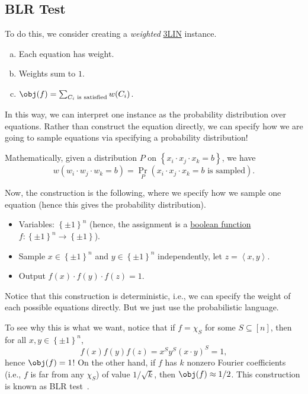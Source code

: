 \subsection{BLR Test}
To do this, we consider creating a \emph{weighted} \hyperref[prb:max-3LIN]{3LIN} instance.
\begin{enumerate}[(a)]
	\item Each equation has weight.
	\item Weights sum to \(1\).
	\item \(\obj(f) = \sum_{C_i \text{ is satisfied}} w(C_i)\).
\end{enumerate}
In this way, we can interpret one instance as the probability distribution over equations. Rather than construct the equation directly, we can specify how we are going to sample equations via specifying a probability distribution!

\begin{remark}
	Mathematically, given a distribution \(P\) on \(\left\{ x_i\cdot x_j \cdot x_k = b \right\} \), we have
	\[
		w(w_{i} \cdot w_{j} \cdot w_{k} = b) = \Pr_{P}(\text{\(x_i \cdot x_j \cdot x_k = b\) is sampled} ).
	\]
\end{remark}

Now, the construction is the following, where we specify how we sample one equation (hence this gives the probability distribution).
\begin{itemize}
	\item Variables: \(\left\{ \pm 1 \right\} ^n\) (hence, the assignment is a \hyperref[def:boolean-function]{boolean function} \(f\colon \left\{ \pm 1 \right\} ^n \to  \left\{ \pm 1 \right\} \)).
	\item Sample \(x\in \left\{ \pm 1 \right\} ^n\) and \(y\in \left\{ \pm 1 \right\} ^n\) independently, let \(z = \left\langle x, y \right\rangle \).
	\item Output \(f(x) \cdot f(y)\cdot f(z) = 1\).
\end{itemize}

\begin{note}
	Notice that this construction is deterministic, i.e., we can specify the weight of each possible equations directly. But we just use the probabilistic language.
\end{note}

To see why this is what we want, notice that if \(f = \chi _S\) for some \(S \subseteq [n]\), then for all \(x, y\in \left\{ \pm 1 \right\} ^n\),
\[
	f(x) f(y) f(z) = x^S y^S (x\cdot y)^S = 1,
\]
hence \(\obj(f) = 1\)! On the other hand, if \(f\) has \(k\) nonzero Fourier coefficients (i.e., \(f\) is far from any \(\chi _S\)) of value \(1 / \sqrt{k} \), then \(\obj(f) \approx 1 / 2\). This construction is known as BLR test~\cite{10.1145/100216.100225}.

